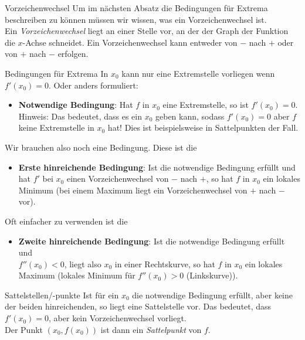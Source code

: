 \begin{bla}{Vorzeichenwechsel}
  Um im nächsten Absatz die Bedingungen für Extrema beschreiben zu können müssen wir wissen, was ein Vorzeichenwechsel ist. \\ Ein \emph{Vorzeichenwechsel} liegt an einer Stelle vor, an der der Graph der Funktion die $x$-Achse schneidet. Ein Vorzeichenwechsel kann entweder von $-$ nach $+$ oder von $+$ nach $-$ erfolgen.
\end{bla}

\begin{bla}{Bedingungen für Extrema}
  In $x_0$ kann nur eine Extremstelle vorliegen wenn $f'(x_0)=0$. Oder anders formuliert:
  \begin{itemize}
    \item \textbf{Notwendige Bedingung}: Hat $f$ in $x_0$ eine Extremstelle, so ist $f'(x_0)=0$. \\
    Hinweis: Das bedeutet, dass es ein $x_{0}$ geben kann, sodass $f'(x_{0})=0$ aber $f$ keine Extremstelle in $x_{0}$ hat! Dies ist beispielsweise in Sattelpunkten der Fall.
  \end{itemize}
  Wir brauchen also noch eine Bedingung. Diese ist die
  \begin{itemize}
    \item \textbf{Erste hinreichende Bedingung}: Ist die notwendige Bedingung erfüllt und hat $f'$ bei $x_0$ einen Vorzeichenwechsel von $-$ nach $+$, so hat $f$ in $x_0$ ein lokales Minimum (bei einem Maximum liegt ein Vorzeichenwechsel von $+$ nach $-$ vor).
  \end{itemize}
  Oft einfacher zu verwenden ist die
  \begin{itemize}
    \item \textbf{Zweite hinreichende Bedingung}: Ist die notwendige Bedingung erfüllt und \\ $f''(x_0)<0$, liegt also $x_0$ in einer Rechtskurve, so hat $f$ in $x_0$ ein lokales Maximum (lokales Minimum für $f''(x_0)>0$ (Linkskurve)).
  \end{itemize}
\end{bla}

\clearpage
\begin{bla}{Sattelstellen/-punkte}
  Ist für ein $x_0$ die notwendige Bedingung erfüllt, aber keine der beiden hinreichenden, so liegt eine Sattelstelle vor. Das bedeutet, dass $f'(x_0)=0$, aber kein Vorzeichenwechsel vorliegt. \\ Der Punkt $(x_0,f(x_0))$ ist dann ein \emph{Sattelpunkt} von $f$.
\end{bla}

